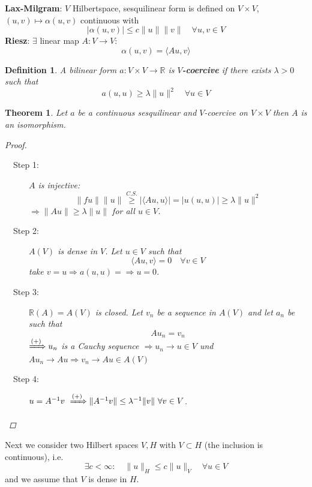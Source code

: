 \documentclass[12pt]{extreport} %
\newcommand{\R}{\mathbb{R}}
\theoremstyle{named}
\theoremstyle{nnamed}
\theoremstyle{itshape}
\newtheorem{definition}{Definition}  \counterwithin{definition}{chapter}
\newtheorem{theorem}{Theorem}  \counterwithin{theorem}{chapter}
\theoremstyle{normal}
\begin{document}
\textbf{Lax-Milgram}: $V$ Hilbertspace, sesquilinear form is defined on $V \times V$, $(u, v) \mapsto \alpha (u, v)$ continuous with
$$ \left| \alpha (u, v) \right| \leq c \| u \| \|v \| \quad \forall u,v \in V $$
\textbf{Riesz}: $\exists$ linear map $A \colon V \rightarrow V$:
$$ \alpha(u, v ) = \langle A u, v \rangle $$

\begin{definition}
	A bilinear form $a \colon V \times V \rightarrow \R$ is \textbf{$V$-coercive} if there exists $\lambda > 0$ such that
	$$ a\left( u, u \right) \geq \lambda \| u \|^2 \quad \forall u \in V $$
\end{definition}

\begin{theorem}
	Let $a$ be a continuous sesquilinear and $V$-coercive on $V \times V$ then $A$ is an isomorphism.
	
	\begin{proof} ~\
		\begin{description}
			\item[~\hspace{0.25em}~Step 1:] $A$ is injective:
				$$ \| fu \| \| u \| \overset{C.S.}{\geq} \left| \langle A u, u \rangle \right| = \left| u(u, u) \right| \geq \lambda \| u \|^2 $$
				$\Rightarrow \| A u\| \geq \lambda \| u \|$ for all $u \in V$.
			\item[~\hspace{0.25em}~Step 2:] $A(V)$ is dense in $V$. Let $u \in V$ such that 
				$$ \langle A u, v \rangle = 0 \quad \forall v \in V $$
				take $v = u \Rightarrow a(u, u) = \Rightarrow u = 0$. 
			\item[~\hspace{0.25em}~Step 3:] $\R(A) = A(V)$ is closed. Let $v_n$ be a sequence in $A(V)$ and let $a_n$ be such that
				$$ A u_n = v_n $$
				$\xRightarrow[]{(+)} u_n$ is a Cauchy sequence $\Rightarrow u_n \rightarrow u \in V$ und $A u_n \rightarrow A u \Rightarrow v_n \rightarrow A u \in A(V)$
			\item[~\hspace{0.25em}~Step 4:] $u = A^{-1} v \xRightarrow[]{(+)} \|A^{-1} v \| \leq \lambda^{-1} \| v \| ~\forall v \in V$. 
		\end{description}
	\end{proof}
\end{theorem}

Next we consider two Hilbert spaces $V, H$ with $V \subset H$ (the inclusion is continuous), i.e.
$$ \exists c < \infty \colon \quad \| u \|_H \leq c \| u \|_V \quad \forall u \in V $$
and we assume that $V$ is dense in $H$.
\end{document}
